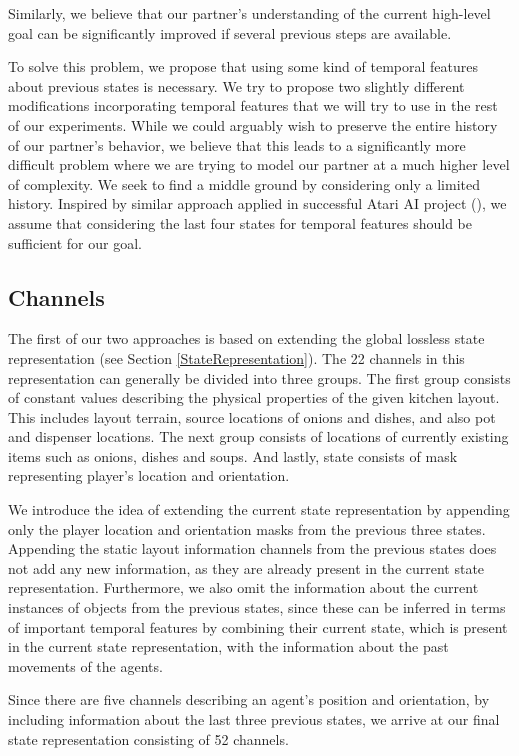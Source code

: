 Similarly, we believe that our partner's understanding of the current high-level goal can be significantly improved if several previous steps are available.

To solve this problem, we propose that using some kind of temporal features about previous states is necessary.
We try to propose two slightly different modifications incorporating temporal features that we will try to use in the rest of our experiments.
While we could arguably wish to preserve the entire history of our partner's behavior, we believe that this leads to a significantly more difficult problem where we are trying to model our partner at a much higher level of complexity.
We seek to find a middle ground by considering only a limited history.
Inspired by similar approach applied in successful Atari AI project (\cite{Atari}), we assume that considering the last four states for temporal features should be sufficient for our goal.


\subsection{Channels}
The first of our two approaches is based on extending the global lossless state representation (see Section \ref{StateRepresentation}).
The 22 channels in this representation can generally be divided into three groups.
The first group consists of constant values describing the physical properties of the given kitchen layout. 
This includes layout terrain, source locations of onions and dishes, and also pot and dispenser locations.
The next group consists of locations of currently existing items such as onions, dishes and soups.
And lastly, state consists of mask representing player's location and orientation.

We introduce the idea of extending the current state representation by appending only the player location and orientation masks from the previous three states.
Appending the static layout information channels from the previous states does not add any new information, as they are already present in the current state representation.
Furthermore, we also omit the information about the current instances of objects from the previous states, since these can be inferred in terms of important temporal features by combining their current state, which is present in the current state representation, with the information about the past movements of the agents.

Since there are five channels describing an agent's position and orientation, by including information about the last three previous states, we arrive at our final state representation consisting of 52 channels.

